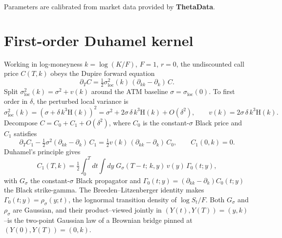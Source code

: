 \documentclass[11pt]{article}
\newcommand{\sloc}{\sigma_{\mathrm{loc}}}
\newcommand{\Hev}{\mathrm{H}}
\begin{document}
Parameters are calibrated from market data provided by \textbf{ThetaData}.

\appendix

\section{First-order Duhamel kernel}\label{app:K1}

Working in log-moneyness $k=\log(K/F)$, $F=1$, $r=0$, the
undiscounted call price $C(T,k)$ obeys the Dupire forward equation
\begin{equation}
\partial_T C
= \tfrac{1}{2}\sloc^2(k)\,(\partial_{kk}-\partial_k)\,C.
\label{eq:dupire-app}
\end{equation}
Split $\sloc^2(k)=\sigma^2 + v(k)$ around the ATM baseline
$\sigma=\sloc(0)$. To first order in $\delta$, the perturbed
local variance is
\[
\sloc^2(k) = (\sigma + \delta\,k^3\Hev(k))^2
= \sigma^2 + 2\sigma\,\delta\,k^3\Hev(k) + O(\delta^2),
\qquad v(k)=2\sigma\,\delta\,k^3\Hev(k).
\]
Decompose $C = C_0 + C_1 + O(\delta^2)$, where $C_0$ is the constant-$\sigma$
Black price and $C_1$ satisfies
\[
\partial_T C_1 - \tfrac{1}{2}\sigma^2(\partial_{kk}-\partial_k)\,C_1
= \tfrac{1}{2}v(k)\,(\partial_{kk}-\partial_k)\,C_0,
\qquad C_1(0,k)=0.
\]
Duhamel's principle gives
\begin{equation}
C_1(T,k)
= \tfrac{1}{2}\int_0^T\!\!dt \int dy\;
   G_\sigma(T-t;\,k,y)\,v(y)\,\Gamma_0(t;y),
\label{eq:duhamel}
\end{equation}
with $G_\sigma$ the constant-$\sigma$ Black propagator and
$\Gamma_0(t;y) = (\partial_{kk}-\partial_k)C_0(t;y)$ the Black
strike-gamma. The Breeden--Litzenberger identity makes
$\Gamma_0(t;y) = \rho_\sigma(y;t)$, the lognormal transition density
of $\log S_t/F$. Both $G_\sigma$ and $\rho_\sigma$ are Gaussian, and
their product--viewed jointly in $(Y(t),Y(T))=(y,k)$--is the
two-point Gaussian law of a Brownian bridge pinned at
$(Y(0),Y(T))=(0,k)$.
\end{document}
